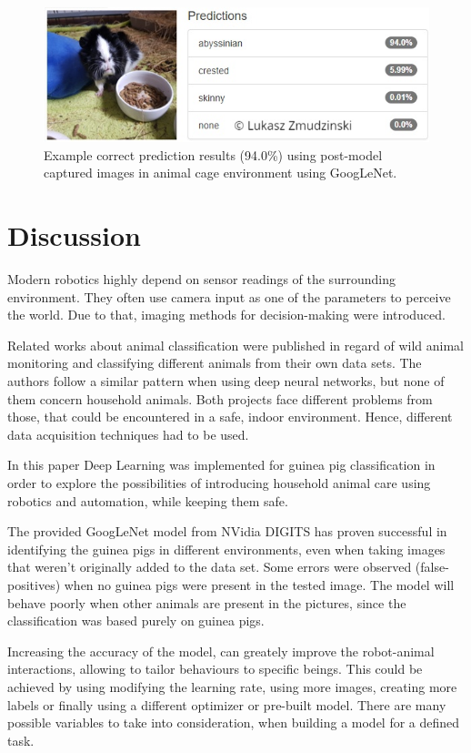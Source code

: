 \documentclass[10pt,journal,compsoc]{IEEEtran}
\begin{document}
    \begin{figure}[h!]
        \includegraphics[width=\linewidth]{result_02.png}
        \caption{Example correct prediction results (94.0\%) using post-model captured images in animal cage environment using GoogLeNet.}
        \label{fig:result_02}
        \centering
    \end{figure}
    
    \section{Discussion}
    Modern robotics highly depend on sensor readings of the surrounding environment. They often use camera input as one of the parameters to perceive the world. Due to that, imaging methods for decision-making were introduced.

    Related works about animal classification were published in regard of wild animal monitoring \cite{wild, trap2} and classifying different animals from their own data sets\cite{trap}. The authors follow a similar pattern when using deep neural networks, but none of them concern household animals. Both projects face different problems from those, that could be encountered in a safe, indoor environment. Hence, different data acquisition techniques had to be used. 

    In this paper Deep Learning was implemented for guinea pig classification in order to explore the possibilities of introducing household animal care using robotics and automation, while keeping them safe.

    The provided GoogLeNet model from NVidia DIGITS has proven successful in identifying the guinea pigs in different environments, even when taking images that weren't originally added to the data set. Some errors were observed (false-positives) when no guinea pigs were present in the tested image. The model will behave poorly when other animals are present in the pictures, since the classification was based purely on guinea pigs.

    Increasing the accuracy of the model, can greately improve the robot-animal interactions, allowing to tailor behaviours to specific beings. This could be achieved by using modifying the learning rate, using more images, creating more labels or finally using a different optimizer or pre-built model. There are many possible variables to take into consideration, when building a model for a defined task.
\end{document}
